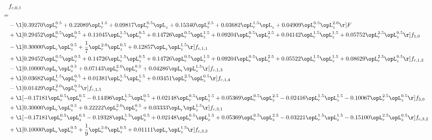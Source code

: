 \begin{alignat}{2} 
\label{eq:f_01_1} 
& f_{c,0,1} \nonumber \\ 
 = \\ 
& - \l[  0.39270 \opL_r^{0.5} +  0.22089 \opL_r^{1.5} +  0.09817 \opL_r^{0.5} \opL_z +  0.15340 \opL_r^{2.5} +  0.03682 \opL_r^{1.5} \opL_z +  0.04909 \opL_r^{0.5} \opL_z^{2.0}  \r] F \nonumber \\ 
& + \l[  0.29452 \opL_r^{0.5} \opL_z^{0.5} +  0.11045 \opL_r^{1.5} \opL_z^{0.5} +  0.14726 \opL_r^{0.5} \opL_z^{1.5} +  0.09204 \opL_r^{0.5} \opL_z^{2.5} +  0.04142 \opL_r^{1.5} \opL_z^{1.5} +  0.05752 \opL_r^{2.5} \opL_z^{0.5}  \r] f_{1,0} \nonumber \\ 
& - \l[  0.30000 \opL_r \opL_z^{0.5} + \frac{1}{7} \opL_r^{2.0} \opL_z^{0.5} +  0.12857 \opL_r \opL_z^{1.5}  \r] f_{c,1,1} \nonumber \\ 
& + \l[  0.29452 \opL_r^{0.5} \opL_z^{0.5} +  0.14726 \opL_r^{1.5} \opL_z^{0.5} +  0.14726 \opL_r^{0.5} \opL_z^{1.5} +  0.09204 \opL_r^{0.5} \opL_z^{2.5} +  0.05522 \opL_r^{1.5} \opL_z^{1.5} +  0.08629 \opL_r^{2.5} \opL_z^{0.5}  \r] f_{c,1,2} \nonumber \\ 
& - \l[  0.10000 \opL_r \opL_z^{0.5} +  0.07143 \opL_r^{2.0} \opL_z^{0.5} +  0.04286 \opL_r \opL_z^{1.5}  \r] f_{c,1,3} \nonumber \\ 
& + \l[  0.03682 \opL_r^{1.5} \opL_z^{0.5} +  0.01381 \opL_r^{1.5} \opL_z^{1.5} +  0.03451 \opL_r^{2.5} \opL_z^{0.5}  \r] f_{c,1,4} \nonumber \\ 
& - \l[  0.01429 \opL_r^{2.0} \opL_z^{0.5}  \r] f_{c,1,5} \nonumber \\ 
& + \l[  -0.17181 \opL_r^{0.5} \opL_z^{0.5}   -0.14496 \opL_r^{1.5} \opL_z^{0.5} +  0.02148 \opL_r^{0.5} \opL_z^{1.5} +  0.05369 \opL_r^{0.5} \opL_z^{2.5}   -0.02416 \opL_r^{1.5} \opL_z^{1.5}   -0.10067 \opL_r^{2.5} \opL_z^{0.5}  \r] f_{3,0} \nonumber \\ 
& + \l[  0.30000 \opL_r \opL_z^{0.5} +  0.22222 \opL_r^{2.0} \opL_z^{0.5} +  0.03333 \opL_r \opL_z^{1.5}  \r] f_{c,3,1} \nonumber \\ 
& + \l[  -0.17181 \opL_r^{0.5} \opL_z^{0.5}   -0.19328 \opL_r^{1.5} \opL_z^{0.5} +  0.02148 \opL_r^{0.5} \opL_z^{1.5} +  0.05369 \opL_r^{0.5} \opL_z^{2.5}   -0.03221 \opL_r^{1.5} \opL_z^{1.5}   -0.15100 \opL_r^{2.5} \opL_z^{0.5}  \r] f_{c,3,2} \nonumber \\ 
& + \l[  0.10000 \opL_r \opL_z^{0.5} + \frac{1}{9} \opL_r^{2.0} \opL_z^{0.5} +  0.01111 \opL_r \opL_z^{1.5}  \r] f_{c,3,3} \nonumber \\ 

\end{alignat}
